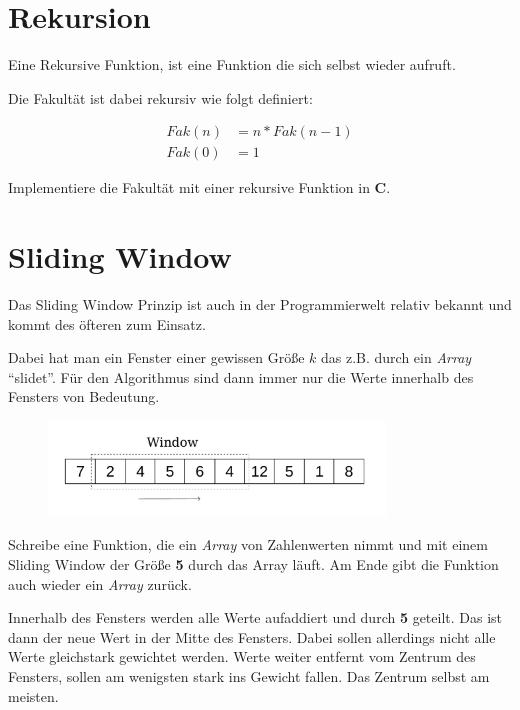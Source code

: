 \documentclass[c_worksheet.tex]{subfiles}
\begin{document}
\section{Rekursion} 


Eine Rekursive Funktion, ist eine Funktion die sich selbst wieder aufruft.

Die Fakultät ist dabei rekursiv wie folgt definiert:

\begin{align*}
	Fak(n) &= n * Fak(n-1) \\
	Fak(0) &= 1
\end{align*}

Implementiere die Fakultät mit einer rekursive Funktion in \textbf{C}.



\section{Sliding Window} 

Das Sliding Window Prinzip ist auch in der Programmierwelt relativ bekannt und kommt des öfteren zum Einsatz.

Dabei hat man ein Fenster einer gewissen Größe \(k\) das z.B. durch ein \emph{Array} ``slidet''. Für den Algorithmus sind dann immer nur die Werte innerhalb des Fensters von Bedeutung.

\begin{figure}[h]
\center
\includegraphics[width=0.8\textwidth]{Grafiken/Aufgaben/slidingWindow} 
\end{figure}

Schreibe eine Funktion, die ein \emph{Array} von Zahlenwerten nimmt und mit einem Sliding Window der Größe \textbf{5} durch das Array läuft. Am Ende gibt die Funktion auch wieder ein \emph{Array} zurück.

Innerhalb des Fensters werden alle Werte aufaddiert und durch \textbf{5} geteilt. Das ist dann der neue Wert in der Mitte des Fensters. Dabei sollen allerdings nicht alle Werte gleichstark gewichtet werden. Werte weiter entfernt vom Zentrum des Fensters, sollen am wenigsten stark ins Gewicht fallen. Das Zentrum selbst am meisten.\\
\end{document}
